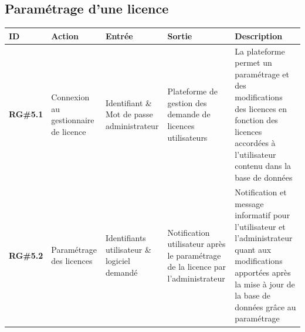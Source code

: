 \subsection{Paramétrage d'une licence}

\begin{table}[!h] %
    \small
    \begin{tabular}{|m{1.5cm}|m{1.9cm}|m{2.5cm}|m{2.5cm}|m{7cm}|} 
	\hline
	    \textbf{ID} & \textbf{Action} & \textbf{Entrée} & \textbf{Sortie} & \textbf{Description} \\
	\hline
	    \textbf{RG\#5.1} & Connexion au gestionnaire de licence & Identifiant \& Mot de passe administrateur & Plateforme de gestion  des demande de licences utilisateurs & La plateforme permet un paramétrage et des modifications des licences en fonction des licences accordées à l'utilisateur contenu dans la base de données\\
	\hline
	    \textbf{RG\#5.2} & Paramétrage  des licences& Identifiants utilisateur \&  logiciel demandé & Notification utilisateur après le paramétrage de la licence par l'administrateur & Notification et message informatif pour l'utilisateur et l'administrateur quant aux modifications apportées après la mise à jour de la base de données grâce au paramétrage\\
	\hline	    
    \end{tabular}
\end{table}

